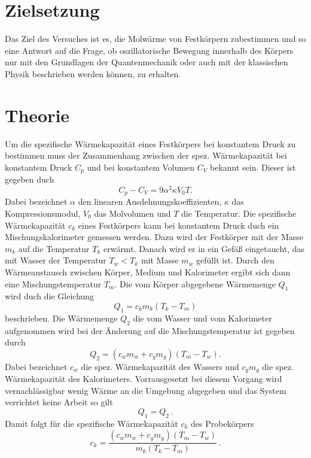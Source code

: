 \section{Zielsetzung}
Das Ziel des Versuches ist es, die Molwärme von Festkörpern zubestimmen und
so eine Antwort auf die Frage, ob oszillatorische Bewegung innerhalb des Körpers
nur mit den Grundlagen der Quantenmechanik oder auch mit der klassischen Physik
beschrieben werden können, zu erhalten.
\section{Theorie}
\label{sec:Theorie}
Um die spezifische Wärmekapazität eines Festkörpers bei konstantem Druck zu
bestimmen muss der Zusammenhang zwischen der spez. Wärmekapazität bei
konstantem Druck $C_p$ und bei konstantem Volumen $C_V$ bekannt sein. Dieser ist
gegeben duch
\begin{equation}
  C_p - C_V = 9 \alpha^2 \kappa V_0 T.
\end{equation}
Dabei bezeichnet $\alpha$ den linearen Ausdehnungskoeffizienten,
$\kappa$ das Kompressionsmodul, $V_0$ das Molvolumen und $T$ die Temperatur.
Die spezifische Wärmekapazität $c_k $ eines Festkörpers kann bei konstantem
Druck duch ein Mischungskalorimeter gemessen werden. Dazu wird der Festkörper
mit der Masse $m_k$ auf die Temperatur $T_k$ erwärmt. Danach wird er in ein Gefäß
eingetaucht, das mit Wasser der Temperatur $ T_w < T_k $ mit Masse $m_w$ gefüllt
ist. Durch den Wärmeaustausch zwischen Körper, Medium und Kalorimeter ergibt sich dann
eine Mischungstemperatur $T_m$.  Die vom Körper abgegebene Wärmemenge $Q_1$
wird duch die Gleichung
\begin{equation}
  Q_1 = c_k m_k (T_k - T_m)
\end{equation}
beschrieben. Die Wärmemenge $Q_2$ die vom Wasser und vom Kalorimeter aufgenommen wird
bei der Änderung auf die Mischungstemperatur ist gegeben durch
\begin{equation}
  Q_2 = (c_w m_w + c_g m_g)(T_m - T_w).
\end{equation}
Dabei bezeichnet $c_w$ die spez. Wärmekapazität des Wassers und
$c_gm_g$ die spez. Wärmekapazität des Kalorimeters.
Vorrausgesetzt bei diesem Vorgang wird vernachlässigbar wenig Wärme an die
Umgebung abgegeben und das System verrichtet keine Arbeit so gilt
\begin{equation*}
  Q_1 = Q_2 \, .
\end{equation*}
Damit folgt für die spezifische Wärmekapazität $c_k$ des Probekörpers
\begin{equation}
  c_k = \frac{(c_w m_w + c_g m_g)(T_m - T_w)}{m_k ( T_k - T_m)}\, .
\end{equation}
